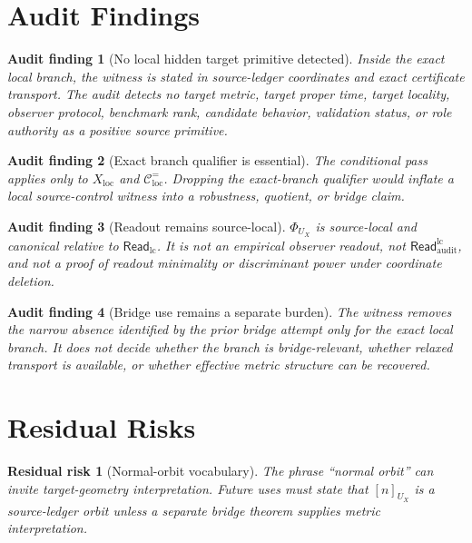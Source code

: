 \documentclass[11pt]{article}
\newcommand{\ReadLC}{\mathsf{Read}_{\mathrm{lc}}}
\newcommand{\ReadAudit}{\mathsf{Read}_{\mathrm{audit}}^{\mathrm{lc}}}
\newtheorem{auditfinding}{Audit finding}
\newtheorem{residualrisk}{Residual risk}
\begin{document}
\section{Audit Findings}

\begin{auditfinding}[No local hidden target primitive detected]
Inside the exact local branch, the witness is stated in source-ledger
coordinates and exact certificate transport. The audit detects no
target metric, target proper time, target locality, observer protocol,
benchmark rank, candidate behavior, validation status, or role
authority as a positive source primitive.
\end{auditfinding}

\begin{auditfinding}[Exact branch qualifier is essential]
The conditional pass applies only to \(X_{\mathrm{loc}}\) and
\(\mathcal{C}^{=}_{\mathrm{loc}}\). Dropping the exact-branch
qualifier would inflate a local source-control witness into a
robustness, quotient, or bridge claim.
\end{auditfinding}

\begin{auditfinding}[Readout remains source-local]
\(\Phi_{U_X}\) is source-local and canonical relative to
\(\ReadLC\). It is not an empirical observer readout, not
\(\ReadAudit\), and not a proof of readout minimality or discriminant
power under coordinate deletion.
\end{auditfinding}

\begin{auditfinding}[Bridge use remains a separate burden]
The witness removes the narrow absence identified by the prior bridge
attempt only for the exact local branch. It does not decide whether
the branch is bridge-relevant, whether relaxed transport is available,
or whether effective metric structure can be recovered.
\end{auditfinding}

\section{Residual Risks}

\begin{residualrisk}[Normal-orbit vocabulary]
The phrase ``normal orbit'' can invite target-geometry interpretation.
Future uses must state that \([n]_{U_X}\) is a source-ledger orbit
unless a separate bridge theorem supplies metric interpretation.
\end{residualrisk}
\end{document}
